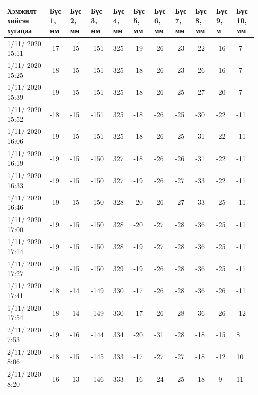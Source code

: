 \begin{table}[h]
    \centering
    \begin{tabular}{|p{1.5cm}|p{0.8cm}|p{0.8cm}|p{0.8cm}|p{0.8cm}|p{0.8cm}|p{0.8cm}|p{0.8cm}|p{0.8cm}|p{0.8cm}|p{0.8cm}|}
         \hline
     Хэмжилт хийсэн хугацаа & Бүс 1, мм&	Бүс 2, мм&	Бүс 3, мм&	Бүс 4, мм&	Бүс 5, мм&	Бүс 6, мм&	Бүс 7, мм&	Бүс 8, мм&	Бүс 9, м&	Бүс 10, мм \\ \hline
1/11/ 2020 15:11&	-17&-15&-151&325&-19&-26&-23&-22&-16&	-7 \\ \hline
1/11/ 2020 15:25&	-18&-15&-151&325&-18&-26&-23&-26&-16&	-7 \\ \hline
1/11/ 2020 15:39&	-19&-15&-151&325&-18&-26&-25&-27&-20&	-7 \\ \hline
1/11/ 2020 15:52&	-18&-15&-151&325&-18&-26&-25&-30&-22&	-11 \\ \hline
1/11/ 2020 16:06&	-19&-15&-151&325&-18&-26&-25&-31&-22&	-11 \\ \hline
1/11/ 2020 16:19&	-19&-15&-150&327&-18&-26&-26&-31&-22&	-11 \\ \hline
1/11/ 2020 16:33&	-19&-15&-150&327&-19&-26&-27&-33&-22&	-11 \\ \hline
1/11/ 2020 16:46&	-19&-15&-150&328&-20&-26&-27&-33&-25&	-11 \\ \hline
1/11/ 2020 17:00&	-19&-15&-150&328&-20&-27&-28&-36&-25&	-11 \\ \hline
1/11/ 2020 17:14&	-19&-15&-150&328&-19&-27&-28&-36&-25&	-11 \\ \hline
1/11/ 2020 17:27&	-19&-15&-150&329&-19&-26&-28&-36&-25&	-11 \\ \hline
1/11/ 2020 17:41&	-18&-14&-149&330&-17&-26&-28&-36&-26&	-11 \\ \hline
1/11/ 2020 17:54&	-18&-14&-149&330&-17&-26&-28&-36&-26&	-12 \\ \hline
2/11/ 2020 7:53&	-19&-16&-144&334&-20&-31&-28&-18&-15&	8 \\ \hline
2/11/ 2020 8:06&	-18&-15&-145&333&-17&-27&-27&-18&-12&	10 \\ \hline
2/11/ 2020 8:20&	-16&-13&-146&333&-16&-24&-25&-18&-9&	11 \\ \hline
    \end{tabular}
\end{table}
